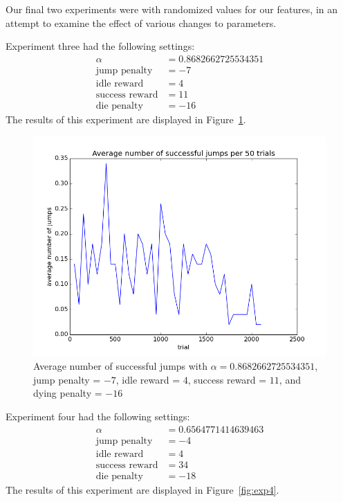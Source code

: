 \documentclass{scrartcl}
\begin{document}
    Our final two experiments were with randomized values for our features, in
    an attempt to examine the effect of various changes to parameters.

    Experiment three had the following settings:
    \begin{align*}
        \alpha &= 0.8682662725534351\\
        \text{jump penalty} &= -7\\
        \text{idle reward} &= 4\\
        \text{success reward} &= 11\\
        \text{die penalty} & = -16
    \end{align*}
    The results of this experiment are displayed in Figure~\ref{fig:exp3}.

    \begin{figure}[H]
        \includegraphics[width=\textwidth]{../avgJumps3}    
        \caption{Average number of successful jumps with $\alpha =
        0.8682662725534351$, jump penalty = $-7$, idle reward = $4$, success
        reward = $11$, and dying penalty = $-16$}
        \label{fig:exp3}
    \end{figure}

    Experiment four had the following settings:
    \begin{align*}
        \alpha &= 0.6564771414639463\\
        \text{jump penalty} &= -4\\
        \text{idle reward} &= 4\\
        \text{success reward} &= 34\\
        \text{die penalty} & = -18
    \end{align*}
    The results of this experiment are displayed in Figure~\ref{fig:exp4}.
\end{document}
